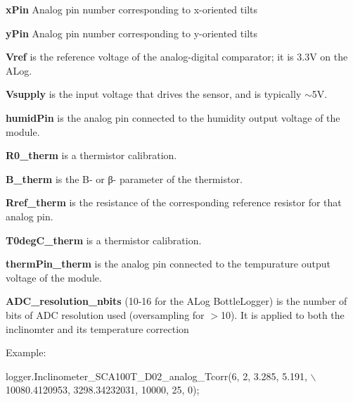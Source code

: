 {\bfseries x\+Pin} Analog pin number corresponding to x-\/oriented tilts

{\bfseries y\+Pin} Analog pin number corresponding to y-\/oriented tilts

{\bfseries Vref} is the reference voltage of the analog-\/digital comparator; it is 3.\+3V on the A\+Log.

{\bfseries Vsupply} is the input voltage that drives the sensor, and is typically $\sim$5V.

{\bfseries humid\+Pin} is the analog pin connected to the humidity output voltage of the module.

{\bfseries R0\+\_\+therm} is a thermistor calibration.

{\bfseries B\+\_\+therm} is the B-\/ or β-\/ parameter of the thermistor.

{\bfseries Rref\+\_\+therm} is the resistance of the corresponding reference resistor for that analog pin.

{\bfseries T0deg\+C\+\_\+therm} is a thermistor calibration.

{\bfseries therm\+Pin\+\_\+therm} is the analog pin connected to the tempurature output voltage of the module.

{\bfseries A\+D\+C\+\_\+resolution\+\_\+nbits} (10-\/16 for the A\+Log Bottle\+Logger) is the number of bits of A\+DC resolution used (oversampling for $>$10). It is applied to both the inclinomter and its temperature correction

Example\+: 
\begin{DoxyCode}
logger.Inclinometer\_SCA100T\_D02\_analog\_Tcorr(6, 2, 3.285, 5.191, \(\backslash\)
       10080.4120953, 3298.34232031, 10000, 25, 0);
\end{DoxyCode}
